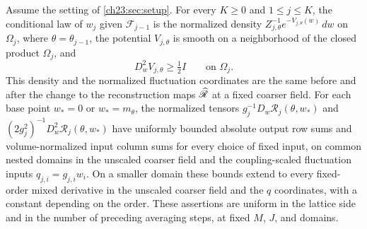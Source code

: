 \begin{lemma}\label{ch23:lem:kernel-reserve}
Assume the setting of \cref{ch23:sec:setup}. For every $K\ge0$ and $1\le j\le K$, the conditional law of $w_j$ given $\mathcal F_{j-1}$ is the normalized density $Z_{j,\theta}^{-1}e^{-V_{j,\theta}(w)}\,dw$ on $\Omega_j$, where $\theta=\theta_{j-1}$, the potential $V_{j,\theta}$ is smooth on a neighborhood of the closed product $\Omega_j$, and
\[
 D_w^2V_{j,\theta}\ge\tfrac12I\qquad\text{on }\Omega_j.
\]
This density and the normalized fluctuation coordinates are the same before and after the change to the reconstruction maps $\widehat{\mathscr R}$ at a fixed coarser field. For each base point $w_*=0$ or $w_*=m_\theta$, the normalized tensors $g_j^{-1}D_w\mathscr R_j(\theta,w_*)$ and $(2g_j^2)^{-1}D_w^2\mathscr R_j(\theta,w_*)$ have uniformly bounded absolute output row sums and volume-normalized input column sums for every choice of fixed input, on common nested domains in the unscaled coarser field and the coupling-scaled fluctuation inputs $q_{j,i}=g_{j,i}w_i$. On a smaller domain these bounds extend to every fixed-order mixed derivative in the unscaled coarser field and the $q$ coordinates, with a constant depending on the order. These assertions are uniform in the lattice side and in the number of preceding averaging steps, at fixed $M$, $J$, and domains.
\end{lemma}

